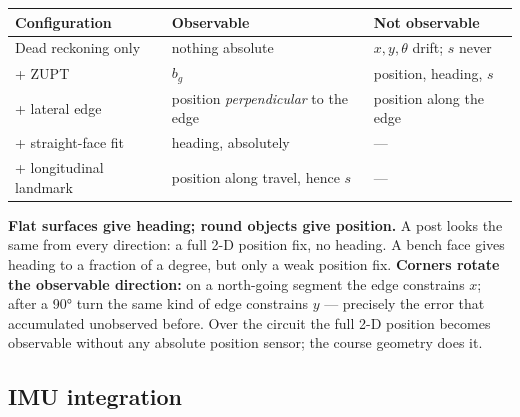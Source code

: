 \documentclass[11pt,a4paper]{article}
\begin{document}
\begin{center}
\small
\begin{tabular}{@{}lll@{}}
\toprule
\textbf{Configuration} & \textbf{Observable} & \textbf{Not observable}\\
\midrule
Dead reckoning only & nothing absolute & $x,y,\theta$ drift; $s$ never\\
+ ZUPT & $b_g$ & position, heading, $s$\\
+ lateral edge & position \emph{perpendicular} to the edge & position along the edge\\
+ straight-face fit & heading, absolutely & ---\\
+ longitudinal landmark & position along travel, hence $s$ & ---\\
\bottomrule
\end{tabular}
\end{center}

\begin{goodbox}
\textbf{Flat surfaces give heading; round objects give position.} A post looks
the same from every direction: a full 2-D position fix, no heading. A bench face
gives heading to a fraction of a degree, but only a weak position fix. \textbf{Corners
rotate the observable direction:} on a north-going segment the edge constrains
$x$; after a \ang{90} turn the same kind of edge constrains $y$ --- precisely the
error that accumulated unobserved before. Over the circuit the full 2-D position
becomes observable without any absolute position sensor; the course geometry does
it.
\end{goodbox}

\subsection{IMU integration}\label{sec:imu}
\end{document}
